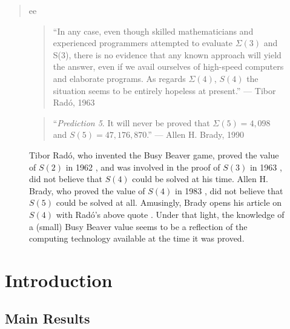 \documentclass[a4paper,british]{article}
\theoremstyle{definition} %
\numberwithin{equation}{section}
\theoremstyle{definition} %
\newcommand{\BBtheFifth}{47{,}176{,}870}
\newcommand{\SigmaTheFifth}{4{,}098}
\newcommand{\radofull}{Tibor Rad\'o\xspace}
\newcommand{\rado}{Rad\'o\xspace}
\begin{document}
\date{}
\maketitle

\begin{abstract}
    ee
\end{abstract}


\setcounter{tocdepth}{2}
\tableofcontents
\newpage

\begin{center}

\end{center}



\begin{figure}
    \begin{quote}
        ``In any case, even though skilled mathematicians and experienced programmers attempted to evaluate $\Sigma(3)$ and S(3), there is no evidence that any known approach will yield the answer, even if we avail ourselves of high-speed computers and elaborate programs. As regards $\Sigma(4)$, $S(4)$ the situation seems to be entirely hopeless at present.'' --- \radofull, 1963 \cite{Rado_1963}
    \end{quote}
    \begin{quote}
        ``\textit{Prediction 5}. It will never be proved that $\Sigma(5) = \SigmaTheFifth$ and $S(5) = \BBtheFifth$.'' --- Allen H. Brady, 1990 \cite{BradyMeaningOfLife}
    \end{quote}
    \caption{\radofull, who invented the Busy Beaver game, proved the value of $S(2)$ in 1962 \cite{Rado_1962}, and was involved in the proof of $S(3)$ in 1963 \cite{Lin1963}, did not believe that $S(4)$ could be solved at his time. Allen H. Brady, who proved the value of $S(4)$ in 1983 \cite{Brady83}, did not believe that $S(5)$ could be solved at all. Amusingly, Brady opens his article on $S(4)$ with \rado's above quote \cite{Brady83}. Under that light, the knowledge of a (small) Busy Beaver value seems to be a reflection of the computing technology available at the time it was proved.}
\end{figure}

\section{Introduction}

\subsection{Main Results}\label{sec:intro:mainresults}
\end{document}
